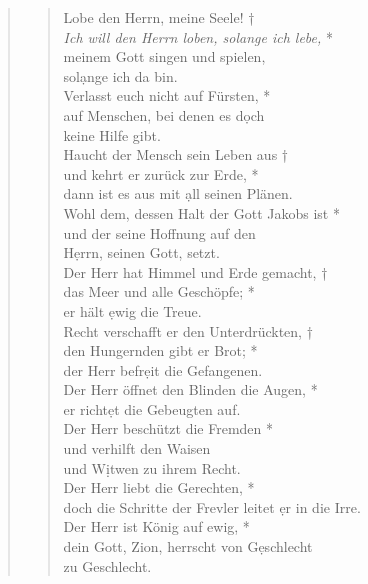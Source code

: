 
\vspace{0.3cm}


\begin{quote}

\begin{verse}
 Lobe den Herrn, meine Seele! †\\
\textit{Ich will den Herrn loben, solange ich lebe,} *\\
meinem Gott singen und spielen,\\ sol\d ange ich da bin. \\
\vin Verlasst euch nicht auf Fürsten, *\\
\vin auf Menschen, bei denen es d\d och \\ \vin keine Hilfe gibt. \\
Haucht der Mensch sein Leben aus †\\
und kehrt er zurück zur Erde, * \\
dann ist es aus mit \d all seinen Plänen. \\
\vin Wohl dem, dessen Halt  der Gott Jakobs ist *\\
\vin und der seine Hoffnung auf den\\ \vin H\d errn, seinen Gott, setzt. \\
Der Herr hat Himmel und Erde gemacht, †\\
das Meer und alle Geschöpfe; * \\
er hält \d ewig die Treue.\\
\vin Recht verschafft er den Unterdrückten, †\\
\vin den Hungernden gibt er Brot; *\\
\vin  der Herr befr\d eit die Gefangenen. \\
Der Herr öffnet den Blinden die Augen, *\\
er richt\d et die Gebeugten auf. \\
\vin Der Herr beschützt die Fremden *\\
\vin und verhilft den Waisen \\ \vin und W\d itwen zu ihrem Recht. \\
Der Herr liebt die Gerechten, * \\
doch die Schritte der Frevler leitet \d er in die Irre.\\
\vin Der Herr ist König auf ewig, *\\
\vin dein Gott, Zion, herrscht von G\d eschlecht \\ \vin zu Geschlecht.\\

\end{verse}

\end{quote}
\vspace{0.3cm}

